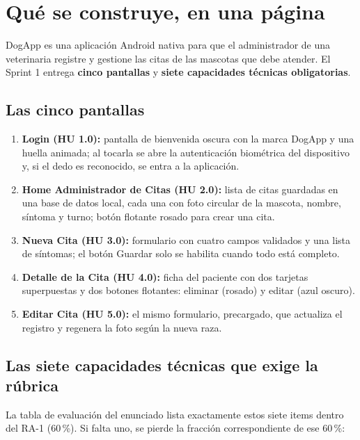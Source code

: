 \documentclass[11pt,letterpaper]{article}
\begin{document}
\tableofcontents
\newpage

\section{Qu\'e se construye, en una p\'agina}

DogApp es una aplicaci\'on Android nativa para que el administrador de una
veterinaria registre y gestione las citas de las mascotas que debe atender.
El Sprint 1 entrega \textbf{cinco pantallas} y \textbf{siete capacidades
t\'ecnicas obligatorias}.

\subsection{Las cinco pantallas}

\begin{enumerate}[leftmargin=1.6em,itemsep=2pt]
  \item \textbf{Login (HU 1.0):} pantalla de bienvenida oscura con la marca
        DogApp y una huella animada; al tocarla se abre la autenticaci\'on
        biom\'etrica del dispositivo y, si el dedo es reconocido, se entra a la
        aplicaci\'on.
  \item \textbf{Home Administrador de Citas (HU 2.0):} lista de citas guardadas en
        una base de datos local, cada una con foto circular de la mascota,
        nombre, s\'intoma y turno; bot\'on flotante rosado para crear una cita.
  \item \textbf{Nueva Cita (HU 3.0):} formulario con cuatro campos validados y una
        lista de s\'intomas; el bot\'on Guardar solo se habilita cuando todo
        est\'a completo.
  \item \textbf{Detalle de la Cita (HU 4.0):} ficha del paciente con dos tarjetas
        superpuestas y dos botones flotantes: eliminar (rosado) y editar
        (azul oscuro).
  \item \textbf{Editar Cita (HU 5.0):} el mismo formulario, precargado, que
        actualiza el registro y regenera la foto seg\'un la nueva raza.
\end{enumerate}

\subsection{Las siete capacidades t\'ecnicas que exige la r\'ubrica}

La tabla de evaluaci\'on del enunciado lista exactamente estos siete items dentro
del RA-1 (60\,\%). Si falta uno, se pierde la fracci\'on correspondiente de ese
60\,\%:
\end{document}
